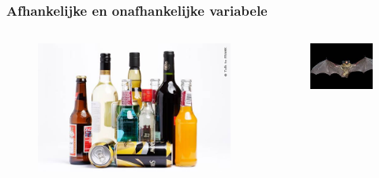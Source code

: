 \documentclass[aspectratio=169]{beamer}
\begin{document}
\begin{frame}
  \frametitle{Afhankelijke en onafhankelijke variabele}
  
  \begin{columns}
    \begin{column}{0.3\textwidth}

      \begin{figure}
        \centering
        \includegraphics[width=1.00\textwidth]{img/liquor.jpg}
        \label{fig:liquor}
      \end{figure}

    \end{column}
    \begin{column}{0.3\textwidth}

      \begin{figure}
        \centering
        \includegraphics[width=1.00\textwidth]{img/bat.jpg}
        \label{fig:bat}
      \end{figure}


\end{column}
\end{columns}
\end{frame}
\end{document}
